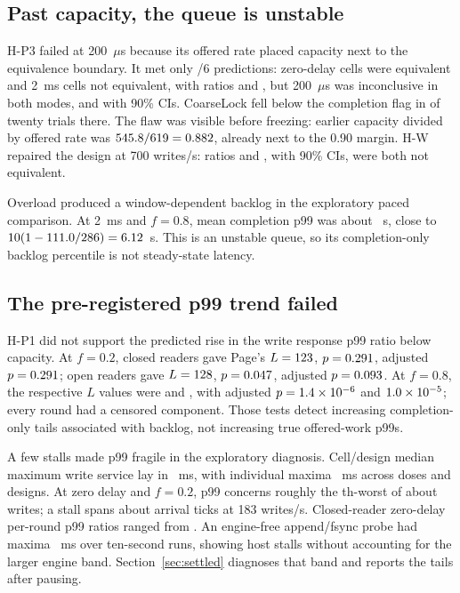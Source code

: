 \documentclass[conference]{IEEEtran}
\begin{document}
\subsection{Past capacity, the queue is unstable}
H-P3 failed at 200~$\mu$s because its offered rate placed capacity next to the equivalence boundary. It met only \PacedHPThreeCount{}/6 predictions: zero-delay cells were equivalent and 2~ms cells not equivalent, with ratios \PacedHPThreeHighClosed{} and \PacedHPThreeHighOpen{}, but 200~$\mu$s was inconclusive in both modes, \PacedHPThreeMediumClosed{} and \PacedHPThreeMediumOpen{} with 90\% CIs. CoarseLock fell below the completion flag in \PacedMediumSaturated{} of twenty trials there. The flaw was visible before freezing: earlier capacity divided by offered rate was $545.8/619=0.882$, already next to the 0.90 margin. H-W repaired the design at 700 writes/s: ratios \SettledHWClosed{} and \SettledHWOpen{}, with 90\% CIs, were both not equivalent.

Overload produced a window-dependent backlog in the exploratory paced comparison. At 2~ms and $f=0.8$, mean completion p99 was about \PacedBacklogObserved{}~s, close to $10(1-111.0/286)=6.12$~s. This is an unstable queue, so its completion-only backlog percentile is not steady-state latency.

\subsection{The pre-registered p99 trend failed}
H-P1 did not support the predicted rise in the write response p99 ratio below capacity. At $f=0.2$, closed readers gave Page's $L=123$, $p=0.291$, adjusted $p=0.291$; open readers gave $L=128$, $p=0.047$, adjusted $p=0.093$. At $f=0.8$, the respective $L$ values were \PacedPageHighClosed{} and \PacedPageHighOpen{}, with adjusted $p=1.4\times10^{-6}$ and $1.0\times10^{-5}$; every round had a censored component. Those tests detect increasing completion-only tails associated with backlog, not increasing true offered-work p99s.

A few stalls made p99 fragile in the exploratory diagnosis. Cell/design median maximum write service lay in \PacedStallMedians{}~ms, with individual maxima \PacedStallRange{}~ms across doses and designs. At zero delay and $f=0.2$, p99 concerns roughly the \PacedTailRank{}th-worst of about \PacedLowWriteCount{} writes; a stall spans about \PacedStallTicks{} arrival ticks at 183 writes/s. Closed-reader zero-delay per-round p99 ratios ranged from \PacedTailRatioRange{}. An engine-free append/fsync probe had maxima \PacedProbeMaxima{}~ms over \PacedProbeCount{} ten-second runs, showing host stalls without accounting for the larger engine band. Section~\ref{sec:settled} diagnoses that band and reports the tails after pausing.
\end{document}
